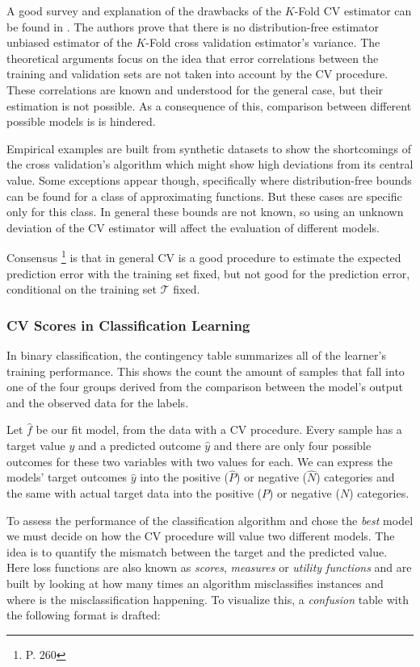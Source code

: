A good survey and explanation of the drawbacks of the $K$-Fold CV estimator can be found in \textcite{bengio-unbiasedCvEstimator}. The authors prove that there is no distribution-free estimator unbiased estimator of the $K$-Fold cross validation estimator's variance. The theoretical arguments focus on the idea that error correlations between the training and validation sets are not taken into account by the CV procedure. These correlations are known and understood for the general case, but their estimation is not possible. As a consequence of this, comparison between different possible models is is hindered.

Empirical examples are built from synthetic datasets to show the shortcomings of the cross validation's algorithm which might show high deviations from its central value. Some exceptions appear though, specifically where distribution-free bounds can be found for a class of approximating functions. But these cases are specific only for this class. In general these bounds are not known, so using an unknown deviation of the CV estimator will affect the evaluation of different models.

Consensus \footnote{\textcite{hastie-elemstatslearn} P. 260} is that in general CV is a good procedure to estimate the expected prediction error with the training set fixed, but not good for the prediction error, conditional on the training set $\mathcal{T}$ fixed.



\subsubsection{CV Scores in Classification Learning}

In binary classification, the contingency table summarizes all of the learner's training performance. This shows the count the amount of samples that fall into one of the four groups derived from the comparison between the model's output and the observed data for the labels.

 Let $\hat{f}$ be our fit model, from the data with a CV procedure. Every sample has a target value $y$ and a predicted outcome $\hat{y}$ and there are only four possible outcomes for these two variables with two values for each.  We can express the models' target outcomes $\hat{y}$ into the positive ($\hat{P}$) or negative ($\hat{N}$) categories and the same with actual target data into the positive ($P$) or negative ($N$) categories.

To assess the performance of the classification algorithm and chose the \textit{best} model we must decide on how the CV procedure will value two different models. The idea is to quantify the mismatch between the target  and the predicted value. Here loss functions are also known as \textit{scores}, \textit{measures} or \textit{utility functions} and are built by looking at how many times an algorithm  misclassifies instances and where is the misclassification happening. To visualize this, a \textit{confusion} table with the following format is drafted:

